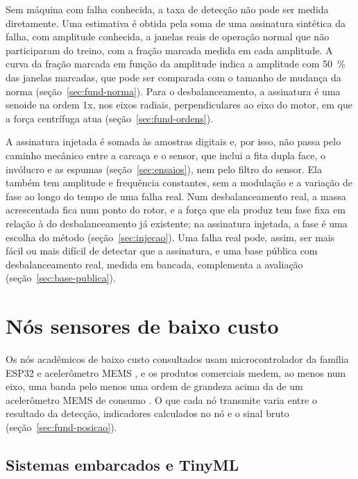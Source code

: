 Sem máquina com falha conhecida, a taxa de detecção não pode ser medida diretamente. Uma estimativa é obtida pela soma de uma assinatura sintética da falha, com amplitude conhecida, a janelas reais de operação normal que não participaram do treino, com a fração marcada medida em cada amplitude. A curva da fração marcada em função da amplitude indica a amplitude com \SI{50}{\percent} das janelas marcadas, que pode ser comparada com o tamanho de mudança da norma (seção~\ref{sec:fund-norma}). Para o desbalanceamento, a assinatura é uma senoide na ordem 1x, nos eixos radiais, perpendiculares ao eixo do motor, em que a força centrífuga atua (seção~\ref{sec:fund-ordens}).

A assinatura injetada é somada às amostras digitais e, por isso, não passa pelo caminho mecânico entre a carcaça e o sensor, que inclui a fita dupla face, o invólucro e as espumas (seção~\ref{sec:ensaios}), nem pelo filtro do sensor. Ela também tem amplitude e frequência constantes, sem a modulação e a variação de fase ao longo do tempo de uma falha real. Num desbalanceamento real, a massa acrescentada fica num ponto do rotor, e a força que ela produz tem fase fixa em relação à do desbalanceamento já existente; na assinatura injetada, a fase é uma escolha do método (seção~\ref{sec:injecao}). Uma falha real pode, assim, ser mais fácil ou mais difícil de detectar que a assinatura, e uma base pública com desbalanceamento real, medida em bancada, complementa a avaliação (seção~\ref{sec:base-publica}).

\section{Nós sensores de baixo custo}\label{sec:fund-nos}

Os nós acadêmicos de baixo custo consultados usam microcontrolador da família ESP32 e acelerômetro MEMS \cite{antonini2023,chevtchenko2023,kolok2025}, e os produtos comerciais medem, ao menos num eixo, uma banda pelo menos uma ordem de grandeza acima da de um acelerômetro MEMS de consumo \cite{bentlynevada2025,erbessd2025,tractian2022}. O que cada nó transmite varia entre o resultado da detecção, indicadores calculados no nó e o sinal bruto (seção~\ref{sec:fund-posicao}).

\subsection{Sistemas embarcados e TinyML}\label{sec:fund-embarcados}

